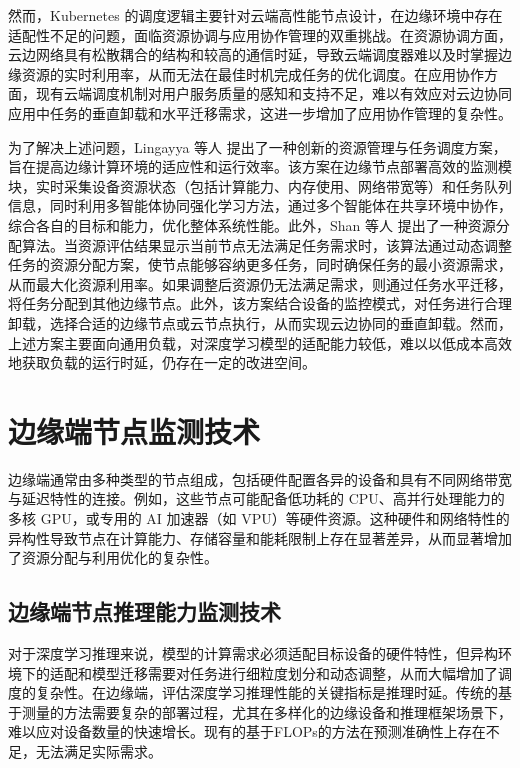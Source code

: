然而，Kubernetes 的调度逻辑主要针对云端高性能节点设计，在边缘环境中存在适配性不足的问题，面临资源协调与应用协作管理的双重挑战。在资源协调方面，云边网络具有松散耦合的结构和较高的通信时延，导致云端调度器难以及时掌握边缘资源的实时利用率，从而无法在最佳时机完成任务的优化调度。在应用协作方面，现有云端调度机制对用户服务质量的感知和支持不足，难以有效应对云边协同应用中任务的垂直卸载和水平迁移需求，这进一步增加了应用协作管理的复杂性。

为了解决上述问题，Lingayya 等人\cite{lingayya2024dynamic} 提出了一种创新的资源管理与任务调度方案，旨在提高边缘计算环境的适应性和运行效率。该方案在边缘节点部署高效的监测模块，实时采集设备资源状态（包括计算能力、内存使用、网络带宽等）和任务队列信息，同时利用多智能体协同强化学习方法，通过多个智能体在共享环境中协作，综合各自的目标和能力，优化整体系统性能。此外，Shan 等人\cite{shan2024kces} 提出了一种资源分配算法。当资源评估结果显示当前节点无法满足任务需求时，该算法通过动态调整任务的资源分配方案，使节点能够容纳更多任务，同时确保任务的最小资源需求，从而最大化资源利用率。如果调整后资源仍无法满足需求，则通过任务水平迁移，将任务分配到其他边缘节点。此外，该方案结合设备的监控模式，对任务进行合理卸载，选择合适的边缘节点或云节点执行，从而实现云边协同的垂直卸载。然而，上述方案主要面向通用负载，对深度学习模型的适配能力较低，难以以低成本高效地获取负载的运行时延，仍存在一定的改进空间。

\section{边缘端节点监测技术}

边缘端通常由多种类型的节点组成，包括硬件配置各异的设备和具有不同网络带宽与延迟特性的连接\cite{cooke2020model,varghese2021survey,barbalace2020edge}。例如，这些节点可能配备低功耗的 CPU、高并行处理能力的多核 GPU，或专用的 AI 加速器（如 VPU）等硬件资源。这种硬件和网络特性的异构性导致节点在计算能力、存储容量和能耗限制上存在显著差异，从而显著增加了资源分配与利用优化的复杂性。

\subsection{边缘端节点推理能力监测技术}

对于深度学习推理来说，模型的计算需求必须适配目标设备的硬件特性，但异构环境下的适配和模型迁移需要对任务进行细粒度划分和动态调整，从而大幅增加了调度的复杂性。在边缘端，评估深度学习推理性能的关键指标是推理时延。传统的基于测量的方法需要复杂的部署过程，尤其在多样化的边缘设备和推理框架场景下，难以应对设备数量的快速增长。现有的基于FLOPs的方法在预测准确性上存在不足，无法满足实际需求。

